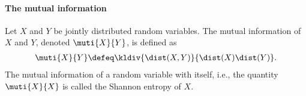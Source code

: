 \paragraph{The mutual information}
Let $X$ and $Y$ be jointly distributed random variables.
The 
mutual information of $X$ and $Y$, 
denoted $\muti{X}{Y}$, is defined as
\begin{align}
\muti{X}{Y} \defeq \kldiv{\dist(X,Y)}{\dist(X)\dist(Y)}.
\label{eq:muti-def}
\end{align}
The mutual information of a random variable 
with itself, i.e., the quantity $\muti{X}{X}$ is 
called the Shannon entropy of $X$.